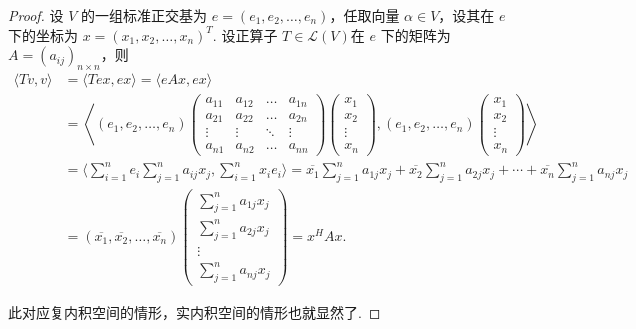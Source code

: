 \begin{proof}
    设 $ V $ 的一组标准正交基为 $ e = (e_1, e_2, \ldots, e_n) $，任取向量 $ \alpha \in V $，设其在 $ e $ 下的坐标为 $ x = (x_1, x_2, \ldots, x_n)^{T} $. 设正算子 $ T \in \mathcal{L}(V) $在 $ e $ 下的矩阵为 $ A = (a_{ij})_{n \times n}$，则
    \begin{align*}
        \langle Tv, v \rangle
         & = \langle Tex, ex \rangle = \langle eAx, ex \rangle                                                                                       \\
         & = \left\langle (e_1, e_2, \ldots ,e_n)
        \begin{pmatrix}
            a_{11} & a_{12} & \ldots & a_{1n} \\
            a_{21} & a_{22} & \ldots & a_{2n} \\
            \vdots & \vdots & \ddots & \vdots \\
            a_{n1} & a_{n2} & \ldots & a_{nn}
        \end{pmatrix}
        \begin{pmatrix}
            x_1    \\
            x_2    \\
            \vdots \\
            x_n
        \end{pmatrix} ,(e_1, e_2, \ldots ,e_n)
        \begin{pmatrix}
            x_1    \\
            x_2    \\
            \vdots \\
            x_n
        \end{pmatrix} \right\rangle                                                                                                                  \\
         & = \langle \sum_{i = 1}^{n}e_{i}\sum_{j = 1}^{n}a_{ij}x_{j}, \sum_{i = 1}^{n}x_{i}e_{i} \rangle
        = \overline{x_1}\sum_{j = 1}^{n}a_{1j}x_{j} + \overline{x_2}\sum_{j = 1}^{n}a_{2j}x_{j} + \cdots + \overline{x_n}\sum_{j = 1}^{n}a_{nj}x_{j} \\
         & = (\overline{x_1}, \overline{x_2}, \ldots, \overline{x_n})
        \begin{pmatrix}
            \sum\limits_{j = 1}^{n}a_{1j}x_{j} \\
            \sum\limits_{j = 1}^{n}a_{2j}x_{j} \\
            \vdots                             \\
            \sum\limits_{j = 1}^{n}a_{nj}x_{j}
        \end{pmatrix}
        = x^{H}Ax.
    \end{align*}

    此对应复内积空间的情形，实内积空间的情形也就显然了.
\end{proof}

